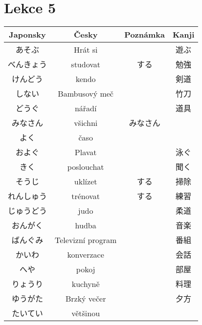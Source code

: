 \section{Lekce 5}
\begin{table}[H]
\centering
\begin{tabular}{cccc}
\hline
Japonsky & Česky                     & Poznámka                   & Kanji \\
\hline
あそぶ   & Hrát si           && 遊ぶ       \\
べんきょう & studovat          & する   & 勉強 \\
けんどう  & kendo             && 剣道       \\
しない   & Bambusový meč&     & 竹刀       \\
どうぐ   & nářadí            && 道具      \\
みなさん  & všichni           & みなさん &    \\
よく    & časo              &      &    \\
およぐ   & Plavat            && 泳ぐ      \\
きく    & poslouchat        && 聞く       \\
そうじ   & uklízet           & する   & 掃除 \\
れんしゅう & trénovat          & する   & 練習 \\
じゅうどう & judo              && 柔道       \\
おんがく  & hudba             && 音楽       \\
ばんぐみ  & Televizní program && 番組      \\
かいわ   & konverzace   &     & 会話       \\
へや    & pokoj            & & 部屋      \\
りょうり  & kuchyně           && 料理      \\
ゆうがた  & Brzký večer    &   & 夕方       \\
たいてい  & většinou          &      &   \\
\hline
\end{tabular}
\end{table}